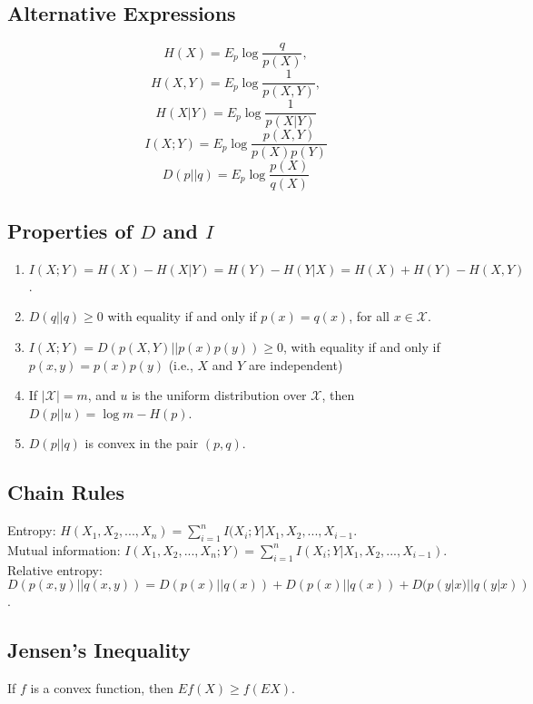 \documentclass{article}
\begin{document}
\subsection*{Alternative Expressions}
\begin{equation}
H(X) = E_p\log \frac{q}{p(X)},
\end{equation}
\begin{equation}
H(X,Y) = E_p\log \frac{1}{p(X,Y)},
\end{equation}
\begin{equation}
H(X|Y) = E_p\log \frac{1}{p(X|Y)}
\end{equation}
\begin{equation}
I(X;Y) = E_p\log \frac{p(X,Y)}{p(X)p(Y)}
\end{equation}
\begin{equation}
D(p||q) = E_p\log \frac{p(X)}{q(X)}
\end{equation}
\subsection*{Properties of $D$ and $I$}
\begin{enumerate}
\item $I(X;Y)=H(X)-H(X|Y)=H(Y)-H(Y|X)=H(X)+H(Y)-H(X,Y)$.
\item $D(q||q)\geq 0$ with equality if and only if $p(x)=q(x)$, for all $x\in \mathcal{X}$.
\item $I(X;Y)=D(p(X,Y)||p(x)p(y))\geq 0$, with equality if and only if $p(x,y)=p(x)p(y)$ (i.e., $X$ and $Y$ are independent)
\item If $|\mathcal{X}|=m$, and $u$ is the uniform distribution over $\mathcal{X}$, then $D(p||u)=\log m-H(p)$.
\item $D(p||q)$ is convex in the pair $(p,q)$.
\end{enumerate}
\subsection*{Chain Rules}
Entropy: $H(X_1,X_2,...,X_n)=\sum_{i=1}^nI(X_i;Y|X_1,X_2,...,X_{i-1}$.\\
Mutual information: $I(X_1,X_2,...,X_n;Y)=\sum_{i=1}^nI(X_i;Y|X_1,X_2,...,X_{i-1})$.\\
Relative entropy: $D(p(x,y)||q(x,y))=D(p(x)||q(x)) + D(p(x)||q(x)) + D(p(y|x)||q(y|x))$.
\subsection*{Jensen's Inequality}
If $f$ is a convex function, then $Ef(X)\geq f(EX)$.
\end{document}
